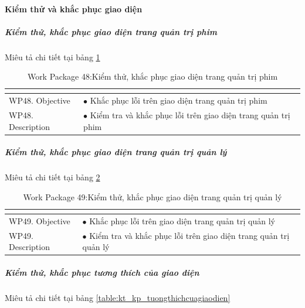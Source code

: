 \documentclass[a4paper]{book}
\begin{document}
\paragraph{Kiểm thử và khắc phục giao diện}
\subparagraph{Kiểm thử, khắc phục giao diện trang quản trị phim} Miêu tả chi tiết tại bảng \ref{table:kt_kp_giaodien_quantriphim}
\begin{table}[h!]
	\begin{center}
		\begin{tabular}{|p{4cm}|p{10cm}|}
			\hline
			\multicolumn{2}{|c|}{\cellcolor[HTML]{363636}{\color[HTML]{FFFFFF}Work package 48: Kiểm thử, khắc phục giao diện trang quản trị phim}}\\
			\hline
			\multirow{1}{*}{WP48. Objective} & $\bullet$ Khắc phục lỗi trên giao diện trang quản trị phim\\
			\hline
			\multirow{1}{*}{WP48. Description} & $\bullet$ Kiểm tra và khắc phục lỗi trên giao diện trang quản trị phim \\
			\hline
		\end{tabular}
		\caption{Work Package 48:Kiểm thử, khắc phục giao diện trang quản trị phim}
		\label{table:kt_kp_giaodien_quantriphim}
	\end{center}
\end{table}
\subparagraph{Kiểm thử, khắc phục giao diện trang quản trị quản lý} Miêu tả chi tiết tại bảng \ref{table:kt_kp_giaodien_quantriquanly}
\begin{table}[h!]
	\begin{center}
		\begin{tabular}{|p{4cm}|p{10cm}|}
			\hline
			\multicolumn{2}{|c|}{\cellcolor[HTML]{363636}{\color[HTML]{FFFFFF}Work package 49: Kiểm thử, khắc phục giao diện trang quản trị quản lý}}\\
			\hline
			\multirow{1}{*}{WP49. Objective} & $\bullet$ Khắc phục lỗi trên giao diện trang quản trị quản lý\\
			\hline
			\multirow{1}{*}{WP49. Description} & $\bullet$ Kiểm tra và khắc phục lỗi trên giao diện trang quản trị quản lý \\
			\hline
		\end{tabular}
		\caption{Work Package 49:Kiểm thử, khắc phục giao diện trang quản trị quản lý}
		\label{table:kt_kp_giaodien_quantriquanly}
	\end{center}
\end{table}
\subparagraph{Kiểm thử, khắc phục tương thích của giao diện} Miêu tả chi tiết tại bảng \ref{table:kt_kp_tuongthichcuagiaodien}
\end{document}
